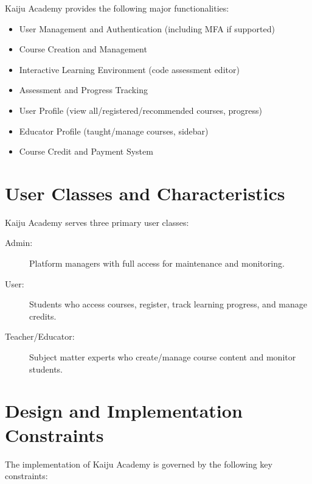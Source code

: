 \documentclass[a4paper, 11pt]{scrreprt}
\begin{document}
Kaiju Academy provides the following major functionalities:
\begin{itemize}
    \item User Management and Authentication (including MFA if supported)
    \item Course Creation and Management
    \item Interactive Learning Environment (code assessment editor)
    \item Assessment and Progress Tracking
    \item User Profile (view all/registered/recommended courses, progress)
    \item Educator Profile (taught/manage courses, sidebar)
    \item Course Credit and Payment System
\end{itemize}

\section{User Classes and Characteristics}

Kaiju Academy serves three primary user classes:
\begin{description}
    \item[Admin:] Platform managers with full access for maintenance and monitoring.
    \item[User:] Students who access courses, register, track learning progress, and manage credits.
    \item[Teacher/Educator:] Subject matter experts who create/manage course content and monitor students.
\end{description}

\section{Design and Implementation Constraints}

The implementation of Kaiju Academy is governed by the following key constraints:
\end{document}
